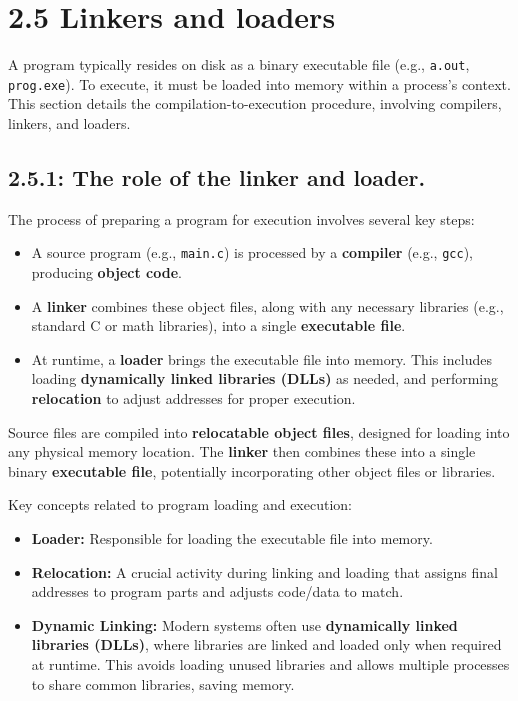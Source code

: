 \section*{2.5 Linkers and loaders}

A program typically resides on disk as a binary executable file (e.g., \texttt{a.out}, \texttt{prog.exe}). To execute, it must be loaded into memory within a process's context. This section details the compilation-to-execution procedure, involving compilers, linkers, and loaders.

\subsection*{2.5.1: The role of the linker and loader.}

The process of preparing a program for execution involves several key steps:
\begin{itemize}
    \item A source program (e.g., \texttt{main.c}) is processed by a \textbf{compiler} (e.g., \texttt{gcc}), producing \textbf{object code}.
    \item A \textbf{linker} combines these object files, along with any necessary libraries (e.g., standard C or math libraries), into a single \textbf{executable file}.
    \item At runtime, a \textbf{loader} brings the executable file into memory. This includes loading \textbf{dynamically linked libraries (DLLs)} as needed, and performing \textbf{relocation} to adjust addresses for proper execution.
\end{itemize}

Source files are compiled into \textbf{relocatable object files}, designed for loading into any physical memory location. The \textbf{linker} then combines these into a single binary \textbf{executable file}, potentially incorporating other object files or libraries.

Key concepts related to program loading and execution:
\begin{itemize}
    \item \textbf{Loader:} Responsible for loading the executable file into memory.
    \item \textbf{Relocation:} A crucial activity during linking and loading that assigns final addresses to program parts and adjusts code/data to match.
    \item \textbf{Dynamic Linking:} Modern systems often use \textbf{dynamically linked libraries (DLLs)}, where libraries are linked and loaded only when required at runtime. This avoids loading unused libraries and allows multiple processes to share common libraries, saving memory.
\end{itemize}

